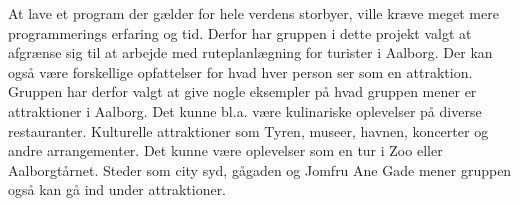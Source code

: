 At lave et program der gælder for hele verdens storbyer, ville kræve meget mere programmerings erfaring og tid. Derfor har gruppen i dette projekt valgt at afgrænse sig til at arbejde med ruteplanlægning for turister i Aalborg. Der kan også være forskellige opfattelser for hvad hver person ser som en attraktion. Gruppen har derfor valgt at give nogle eksempler på hvad gruppen mener er attraktioner i Aalborg. Det kunne bl.a. være kulinariske oplevelser på diverse restauranter. Kulturelle attraktioner som Tyren, museer, havnen, koncerter og andre arrangementer. Det kunne være oplevelser som en tur i Zoo eller Aalborgtårnet. Steder som city syd, gågaden og Jomfru Ane Gade mener gruppen også kan gå ind under attraktioner.

